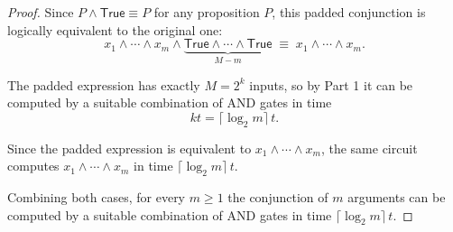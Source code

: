 \begin{solbox}
\begin{proof}
Since $P\wedge\mathsf{True}\equiv P$ for any proposition $P$, this padded conjunction is logically equivalent to the original one:
\[
x_1\wedge\cdots\wedge x_m\wedge\underbrace{\mathsf{True}\wedge\cdots\wedge\mathsf{True}}_{M-m} \;\equiv\; x_1\wedge\cdots\wedge x_m.
\]

The padded expression has exactly $M=2^k$ inputs, so by Part 1 it can be computed by a suitable combination of AND gates in time
\[
kt = \lceil\log_2 m\rceil\, t.
\]

Since the padded expression is equivalent to $x_1\wedge\cdots\wedge x_m$, the same circuit computes $x_1\wedge\cdots\wedge x_m$ in time $\lceil\log_2 m\rceil\, t$.

\bigskip
Combining both cases, for every $m\geq 1$ the conjunction of $m$ arguments can be computed by a suitable combination of AND gates in time $\lceil\log_2 m\rceil\, t$. \qedhere
\end{proof}
\end{solbox}


